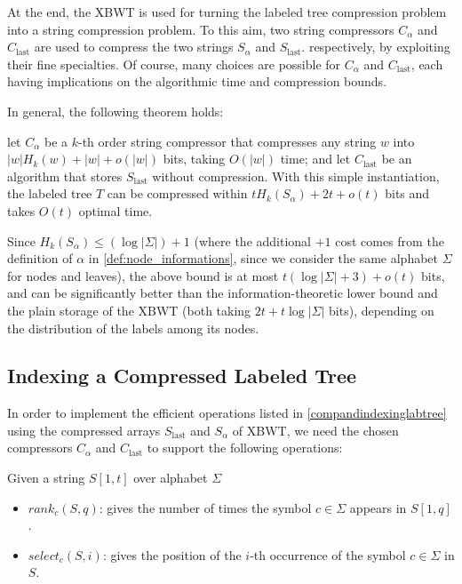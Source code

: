 At the end, the XBWT is used for turning the labeled tree compression problem into a string compression problem. To this aim, two string compressors
$C_{\alpha}$ and $C_{\text{last}}$ are used to compress the two strings $S_{\alpha}$ and $S_{\text{last}}$. respectively, by exploiting their fine specialties. Of course, many choices are possible for $C_{\alpha}$ and $C_{\text{last}}$, each having implications on the algorithmic time and compression bounds.

In general, the following theorem holds:

\begin{theorem}
    let $C_{\alpha}$ be a $k$-th order string compressor that compresses any string $w$ into $|w|H_k(w) + |w| + o(|w|)$ bits, taking $O(|w|)$ time; and let $C_{\text{last}}$ be an algorithm that stores $S_{\text{last}}$ without compression. With this simple instantiation, the labeled tree $T$ can be compressed within $t H_k(S_{\alpha}) + 2t + o(t)$ bits and takes $O(t)$ optimal time.
\end{theorem}

Since $H_k(S_\alpha) \leq (\log |\Sigma|) + 1$
(where the additional $+1$ cost comes from the definition of $\alpha$ in \cref{def:node_informations}, since we consider the same alphabet $\Sigma$ for nodes and leaves), the above bound is at most $t(\log |\Sigma| + 3) + o(t)$ bits, and can be significantly better than the information-theoretic lower bound and the plain storage of the XBWT (both taking $2t + t \log|\Sigma|$ bits), depending on the distribution of the labels among its nodes.

\subsection{Indexing a Compressed Labeled Tree} \label{sec:xbwt_operations}
In order to implement the efficient operations listed in \cref{compandindexinglabtree} using the compressed arrays $S_{\text{last}}$ and $S_{\alpha}$ of XBWT, we need the chosen compressors $C_{\alpha}$ and $C_{\text{last}}$ to support the following operations:

Given a string $S[1, t]$ over alphabet $\Sigma$
\begin{itemize}
    \item \textbf{$rank_c(S, q)$}: gives the number of times the symbol $c \in \Sigma$ appears in $S[1, q]$.
    \item \textbf{$select_c(S, i)$}: gives the position of the $i$-th occurrence of the symbol $c \in \Sigma$ in $S$.
\end{itemize}

